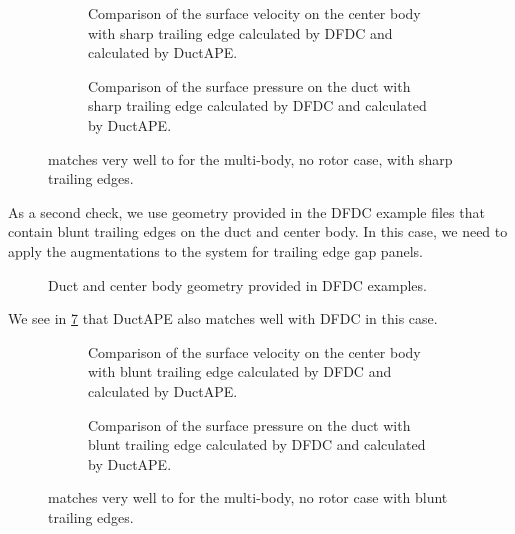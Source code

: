 \begin{figure}[htb]
     \centering
     \begin{subfigure}[b]{0.45\textwidth}
         \raggedright
         \caption{Comparison of the surface velocity on the center body with sharp trailing edge calculated by DFDC and calculated by DuctAPE.}
        \label{fig:dfdclewisvel}
     \end{subfigure}
     \hfill
     \begin{subfigure}[b]{0.45\textwidth}
         \raggedright
         \caption{Comparison of the surface pressure on the duct with sharp trailing edge calculated by DFDC and calculated by DuctAPE.}
         \label{fig:dfdclewiscp}
     \end{subfigure}
     \caption{ matches very well to  for the multi-body, no rotor case, with sharp trailing edges.}
     \label{fig:dfdclewiscomp}
\end{figure}


As a second check, we use geometry provided in the DFDC example files that contain blunt trailing edges on the duct and center body.
%
In this case, we need to apply the augmentations to the system for trailing edge gap panels.
%
\begin{figure}[hb!]
    \centering
        
        \caption{Duct and center body geometry provided in DFDC examples.}
    \label{fig:ducthubvalgeom}
\end{figure}
%
We see in \cref{fig:dfdcexamplecomp} that DuctAPE also matches well with DFDC in this case.

\begin{figure}[htb]
     \centering
     \begin{subfigure}[b]{0.45\textwidth}
         \raggedright
         \caption{Comparison of the surface velocity on the center body with blunt trailing edge calculated by DFDC and calculated by DuctAPE.}
        \label{fig:dfdcexamplevel}
     \end{subfigure}
     \hfill
     \begin{subfigure}[b]{0.45\textwidth}
         \raggedright
         \caption{Comparison of the surface pressure on the duct with blunt trailing edge calculated by DFDC and calculated by DuctAPE.}
         \label{fig:dfdcexamplecp}
     \end{subfigure}
     \caption{ matches very well to  for the multi-body, no rotor case with blunt trailing edges.}
     \label{fig:dfdcexamplecomp}
\end{figure}

